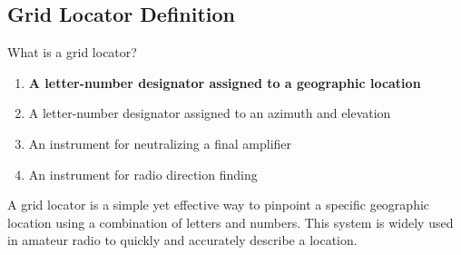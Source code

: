 \subsection{Grid Locator Definition}
\label{T8C05}

\begin{tcolorbox}[colback=gray!10!white,colframe=black!75!black,title=T8C05]
What is a grid locator?
\begin{enumerate}[noitemsep]
    \item \textbf{A letter-number designator assigned to a geographic location}
    \item A letter-number designator assigned to an azimuth and elevation
    \item An instrument for neutralizing a final amplifier
    \item An instrument for radio direction finding
\end{enumerate}
\end{tcolorbox}

A grid locator is a simple yet effective way to pinpoint a specific geographic location using a combination of letters and numbers. This system is widely used in amateur radio to quickly and accurately describe a location.